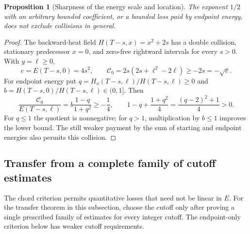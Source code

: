 \documentclass[11pt]{article}
\numberwithin{equation}{section}
\newtheorem{proposition}[theorem]{Proposition}
\theoremstyle{definition}
\theoremstyle{remark}
\begin{document}
\begin{proposition}[Sharpness of the energy scale and location]
\label{phy:chord-sharpness}
The exponent $1/2$ with an arbitrary bounded coefficient, or a bounded
loss paid by endpoint energy, does not exclude collisions in general.
\end{proposition}
\begin{proof}
The backward-heat field $H(T-s,x)=x^2+2s$ has a double collision,
stationary predecessor $x=0$, and zero-free rightward intervals for
every $s>0$.  With $y=\ell\ge0$,
\[
 e=E(T-s,0)=4s^2,\qquad
 \mathcal C_0=2s(2s+\ell^2-2\ell)\ge-2s=-\sqrt e.
\]
For endpoint energy put $q=H_x(T-s,\ell)/H(T-s,\ell)\ge0$ and
$b=H(T-s,0)/H(T-s,\ell)\in(0,1]$.  Then
\[
 \frac{\mathcal C_0}{E(T-s,\ell)}
 =b\frac{1-q}{1+q^2}\ge-\frac14,
 \qquad
 1-q+\frac{1+q^2}{4}=\frac{(q-2)^2+1}{4}>0.
\]
For $q\le1$ the quotient is nonnegative; for $q>1$, multiplication
by $b\le1$ improves the lower bound.  The still weaker payment by the
sum of starting and endpoint energies also permits this collision.
\end{proof}

\subsection{Transfer from a complete family of cutoff estimates}

The chord criterion permits quantitative losses that need not be
linear in $E$. For the transfer theorem in this subsection, choose the
cutoff only after proving a single prescribed family of estimates for
every integer cutoff. The endpoint-only criterion below has weaker
cutoff requirements.
\end{document}

